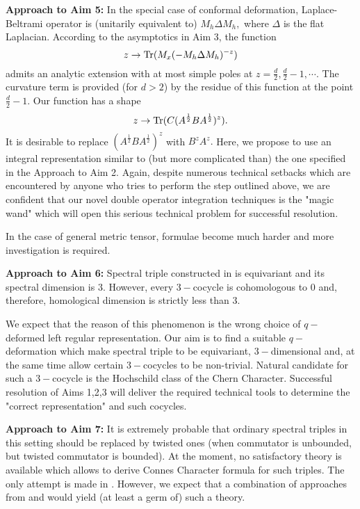 \documentclass{article}
\begin{document}
{\bf Approach to Aim 5:} In the special case of conformal deformation, Laplace-Beltrami operator is (unitarily equivalent to) $M_h\Delta M_h,$ where $\Delta$ is the flat Laplacian. According to the asymptotics in Aim 3, the function
$$z\to {\rm Tr}(M_x(-M_h\Delta M_h)^{-z})$$
admits an analytic extension with at most simple poles at $z=\frac{d}{2},\frac{d}{2}-1,\cdots.$ The curvature term is provided (for $d>2$) by the residue of this function at the point $\frac{d}{2}-1.$ Our function has a shape
$$z\to {\rm Tr}(C(A^{\frac12}BA^{\frac12})^z).$$
It is desirable to replace $(A^{\frac12}BA^{\frac12})^z$ with $B^zA^z.$ Here, we propose to use an integral representation similar to (but more complicated than) the one specified in  the Approach to Aim 2. Again, despite numerous technical setbacks which are encountered by anyone who tries to perform the step outlined above, we are confident that our novel double operator integration techniques is the "magic wand" which will open this serious technical problem for successful resolution.

In the case of general metric tensor, formulae become much harder and more investigation is required. 

{\bf Approach to Aim 6:} Spectral triple constructed in \cite{ChakrabortyPal} is equivariant and its spectral dimension is $3.$ However, every $3-$cocycle is cohomologous to $0$ and, therefore, homological dimension is strictly less than $3.$ 

We expect that the reason of this phenomenon is the wrong choice of $q-$deformed left regular representation. Our aim is to find a suitable $q-$deformation which make spectral triple to be equivariant, $3-$dimensional and, at the same time allow certain $3-$cocycles to be non-trivial. Natural candidate for such a $3-$cocycle is the Hochschild class of the Chern Character. Successful resolution of Aims 1,2,3 will deliver the required technical tools to determine the "correct representation" and such cocycles.

{\bf Approach to Aim 7:} It is extremely probable that ordinary spectral triples in this setting should be replaced by twisted ones (when commutator is unbounded, but twisted commutator is bounded). At the moment, no satisfactory theory is available which allows to derive Connes Character formula for such triples. The only attempt is made in \cite{MasF}. However, we expect that a combination of approaches from \cite{MasF} and \cite{CRSZ} would yield (at least a germ of) such a theory.
\end{document}
